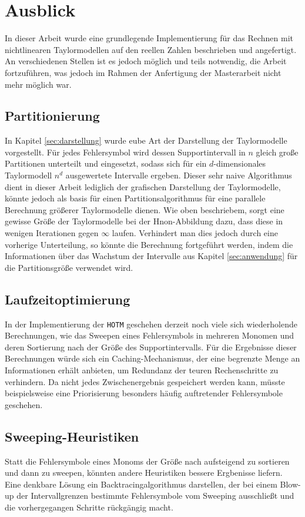 \section{Ausblick}
In dieser Arbeit wurde eine grundlegende Implementierung für das Rechnen mit nichtlinearen Taylormodellen auf den reellen Zahlen beschrieben und angefertigt. An verschiedenen Stellen ist es jedoch möglich und teils notwendig, die Arbeit fortzuführen, was jedoch im Rahmen der Anfertigung der Masterarbeit nicht mehr möglich war.

\subsection{Partitionierung}
In Kapitel \ref{sec:darstellung} wurde eube Art der Darstellung der Taylormodelle vorgestellt. Für jedes Fehlersymbol wird dessen Supportintervall in $n$ gleich große Partitionen unterteilt und eingesetzt, sodass sich für ein $d$-dimensionales Taylormodell $n^d$ ausgewertete Intervalle ergeben. Dieser sehr naive Algorithmus dient in dieser Arbeit lediglich der grafischen Darstellung der Taylormodelle, könnte jedoch als basis für einen Partitionsalgorithmus für eine parallele Berechnung größerer Taylormodelle dienen. Wie oben beschriebem, sorgt eine gewisse Größe der Taylormodelle bei der H\e non-Abbildung dazu, dass diese in wenigen Iterationen gegen $\infty$ laufen. Verhindert man dies jedoch durch eine vorherige Unterteilung, so könnte die Berechnung fortgeführt werden, indem die Informationen über das Wachstum der Intervalle aus Kapitel \ref{sec:anwendung} für die Partitionsgröße verwendet wird.


\subsection{Laufzeitoptimierung}
In der Implementierung der \verb+HOTM+ geschehen derzeit noch viele sich wiederholende Berechnungen, wie das Sweepen eines Fehlersymbols in mehreren Monomen und deren Sortierung nach der Größe des Supportintervalls. Für die Ergebnisse dieser Berechnungen würde sich ein Caching-Mechanismus, der eine begrenzte Menge an Informationen erhält anbieten, um Redundanz der teuren Rechenschritte zu verhindern. Da nicht jedes Zwischenergebnis gespeichert werden kann, müsste beispielsweise eine Priorisierung besonders häufig auftretender Fehlersymbole geschehen.


\subsection{Sweeping-Heuristiken}
Statt die Fehlersymbole eines Monoms der Größe nach aufsteigend zu sortieren und dann zu sweepen, könnten andere Heuristiken bessere Ergbenisse liefern. Eine denkbare Lösung ein Backtracingalgorithmus darstellen, der bei einem Blow-up der Intervallgrenzen bestimmte Fehlersymbole vom Sweeping ausschließt und die vorhergegangen Schritte rückgängig macht.


